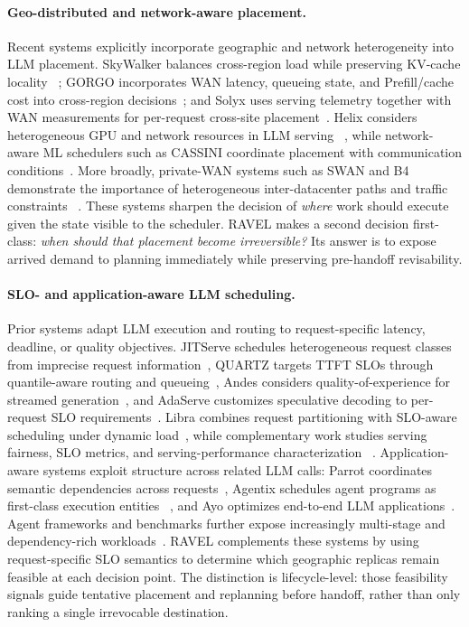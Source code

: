 \paragraph{Geo-distributed and network-aware placement.}
Recent systems explicitly incorporate geographic and network heterogeneity into
LLM placement.
SkyWalker balances cross-region load while preserving KV-cache locality
~\cite{skylb}; GORGO incorporates WAN latency, queueing state, and
Prefill/cache cost into cross-region decisions~\cite{gorgo}; and Solyx uses
serving telemetry together with WAN measurements for per-request cross-site
placement~\cite{solyx}.
Helix considers heterogeneous GPU and network resources in LLM serving
~\cite{helix}, while network-aware ML schedulers such as CASSINI coordinate
placement with communication conditions~\cite{cassini}.
More broadly, private-WAN systems such as SWAN and B4 demonstrate the
importance of heterogeneous inter-datacenter paths and traffic constraints
~\cite{swan,b4}.
These systems sharpen the decision of \emph{where} work should execute given
the state visible to the scheduler.
RAVEL makes a second decision first-class:
\emph{when should that placement become irreversible?}
Its answer is to expose arrived demand to planning immediately while preserving
pre-handoff revisability.

\paragraph{SLO- and application-aware LLM scheduling.}
Prior systems adapt LLM execution and routing to request-specific latency,
deadline, or quality objectives.
JITServe schedules heterogeneous request classes from imprecise request
information~\cite{jitserve}, QUARTZ targets TTFT SLOs through quantile-aware
routing and queueing~\cite{quartz}, Andes considers quality-of-experience for
streamed generation~\cite{andes}, and AdaServe customizes speculative decoding
to per-request SLO requirements~\cite{adaserve}.
Libra combines request partitioning with SLO-aware scheduling under dynamic
load~\cite{libra}, while complementary work studies serving fairness, SLO
metrics, and serving-performance characterization
~\cite{fairness_llm,revisit_slo_goodput,vidur}.
Application-aware systems exploit structure across related LLM calls:
Parrot coordinates semantic dependencies across requests~\cite{parrot},
Agentix schedules agent programs as first-class execution entities
~\cite{agentix}, and Ayo optimizes end-to-end LLM applications~\cite{ayo}.
Agent frameworks and benchmarks further expose increasingly multi-stage and
dependency-rich workloads~\cite{autogen,gaia,agentbench,webarena}.
RAVEL complements these systems by using request-specific SLO semantics to
determine which geographic replicas remain feasible at each decision point.
The distinction is lifecycle-level: those feasibility signals guide tentative
placement and replanning before handoff, rather than only ranking a single
irrevocable destination.

